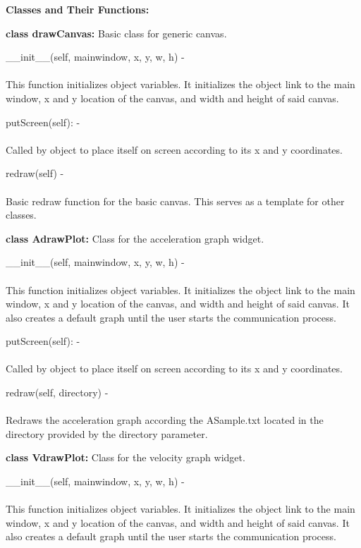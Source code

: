 \documentclass[10pt,draftclsnofoot,onecolumn,compsoc]{IEEEtran}
\begin{document}
{\bf Classes and Their Functions:} \par

{\bf class drawCanvas: }  Basic class for generic canvas. \par

\_\_init\_\_(self, mainwindow, x, y, w, h) - \\ \\
This function initializes object variables. It initializes the object link to the main window, x and y location of the canvas, and width and height of said canvas. \par

putScreen(self): - \\ \\
Called by object to place itself on screen according to its x and y coordinates. \par


redraw(self) - \\ \\
Basic redraw function for the basic canvas. This serves as a template for other classes. \par

{\bf class AdrawPlot: }  Class for the acceleration graph widget. \par

\_\_init\_\_(self, mainwindow, x, y, w, h) - \\ \\
This function initializes object variables. It initializes the object link to the main window, x and y location of the canvas, and width and height of said canvas. It also creates a default graph until the user starts the communication process. \par

putScreen(self): - \\ \\
Called by object to place itself on screen according to its x and y coordinates. \par

redraw(self, directory) - \\ \\
Redraws the acceleration graph according the ASample.txt located in the directory provided by the directory parameter. \par

{\bf class VdrawPlot: }  Class for the velocity graph widget. \par

\_\_init\_\_(self, mainwindow, x, y, w, h) - \\ \\
This function initializes object variables. It initializes the object link to the main window, x and y location of the canvas, and width and height of said canvas. It also creates a default graph until the user starts the communication process. \par
\end{document}
